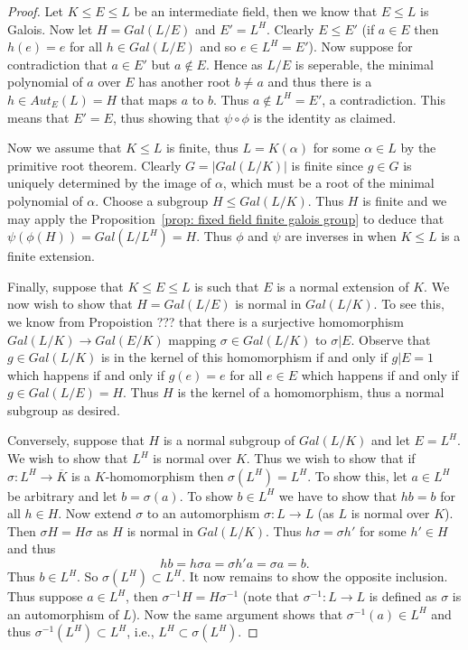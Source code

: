 \documentclass[twoside, a4paper, 10pt]{amsart}
\begin{document}
\begin{proof} Let $K \leq E \leq L$ be an intermediate field, then we know that $E \leq L$ is Galois. Now let $H = Gal(L/E)$ and $E' = L^H$. Clearly $E \leq E'$ (if $a \in E$ then $h(e) = e$ for all $h \in Gal(L/E)$ and so $e \in L^H = E'$). Now suppose for contradiction that $a \in E'$ but $a \notin E$. Hence as $L/E$ is seperable, the minimal polynomial of $a$ over $E$ has another root $b \neq a$ and thus there is a $h \in Aut_E(L) = H$ that maps $a$ to $b$. Thus $a \notin L^H = E'$, a contradiction. This means that $E' = E$, thus showing that $\psi \circ \phi$ is the identity as claimed.

Now we assume that $K \leq L$ is finite, thus $L = K(\alpha)$ for some $\alpha \in L$ by the primitive root theorem. Clearly $G = |Gal(L/K)|$ is finite since $g \in G$ is uniquely determined by the image of $\alpha$, which must be a root of the minimal polynomial of $\alpha$. Choose a subgroup $H \leq Gal(L/K)$. Thus $H$ is finite and we may apply the Proposition~\ref{prop: fixed field finite galois group} to deduce that $\psi(\phi(H)) = Gal(L/L^H) = H$. Thus $\phi$ and $\psi$ are inverses in when $K \leq L$ is a finite extension.

Finally, suppose that $K \leq E \leq L$ is such that $E$ is a normal extension of $K$. We now wish to show that $H = Gal(L/E)$ is normal in $Gal(L/K)$. To see this, we know from Propoistion ??? that there is a surjective homomorphism $Gal(L/K) \to Gal(E/K)$ mapping $\sigma \in Gal(L/K)$ to $\sigma|E$. Observe that $g \in Gal(L/K)$ is in the kernel of this homomorphism if and only if $g|E = 1$ which happens if and only if $g(e) = e$ for all $e \in E$ which happens if and only if $g \in Gal(L/E) = H$. Thus $H$ is the kernel of a homomorphism, thus a normal subgroup as desired.

Conversely, suppose that $H$ is a normal subgroup of $Gal(L/K)$ and let $E = L^H$. We wish to show that $L^H$ is normal over $K$. Thus we wish to show that if $\sigma:L^H \to \overline{K}$ is a $K$-homomorphism then $\sigma(L^H) = L^H$. To show this, let $a \in L^H$ be arbitrary and let $b = \sigma(a)$. To show $b \in L^H$ we have to show that $hb = b$ for all $h \in H$. Now extend $\sigma$ to an automorphism $\sigma:L \to L$ (as $L$ is normal over $K$). Then $\sigma H = H \sigma$ as $H$ is normal in $Gal(L/K)$. Thus $h \sigma = \sigma h'$ for some $h' \in H$ and thus $$ h b = h \sigma a = \sigma h'a = \sigma a = b.$$ Thus $b \in L^H$. So $\sigma(L^H) \subset L^H$. It now remains to show the opposite inclusion. Thus suppose $a \in L^H$, then $\sigma^{-1}H = H \sigma^{-1}$  (note that $\sigma^{-1}:L \to L$ is defined as $\sigma$ is an automorphism of $L$). Now the same argument shows that $\sigma^{-1}(a) \in L^H$ and thus $\sigma^{-1}(L^H) \subset L^H$, i.e., $L^H \subset \sigma(L^H)$. \end{proof}
\end{document}
